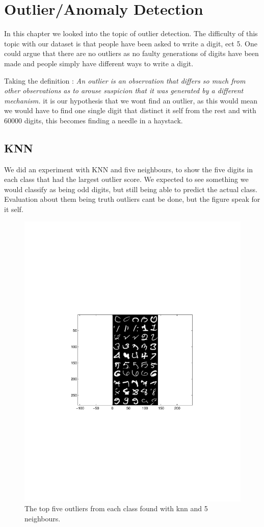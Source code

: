 \chapter{Outlier/Anomaly Detection}

In this chapter we looked into the topic of outlier detection. The difficulty of this topic with our dataset is that people have been asked to write a digit, ect 5. One could argue that there are no outliers as no faulty generations of digits have been made and people simply have different ways to write a digit. 

Taking the definition : \textit{An outlier is an observation that differs so much from other observations as to arouse suspicion that it was generated by a different mechanism.} it is our hypothesis that we wont find an outlier, as this would mean we would have to find one single digit that distinct it self from the rest and with 60000 digits, this becomes finding a needle in a haystack.

\section{KNN}
We did an experiment with KNN and five neighbours, to show the five digits in each class that had the largest outlier score. We expected to see something we would classify as being odd digits, but still being able to predict the actual class. Evaluation about them being truth outliers cant be done, but the figure speak for it self.   

\begin{figure}[H]
\centering
\includegraphics[width=0.6\linewidth]{code/knn_5_outlier}
\caption{The top five outliers from each class found with knn and 5 neighbours.}
\label{fig:outlier_knn}
\end{figure}